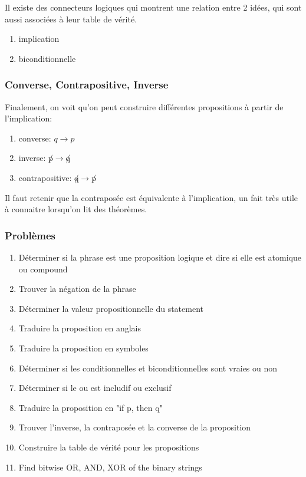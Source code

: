 \documentclass{article}
\begin{document}
Il existe des connecteurs logiques qui montrent une relation entre 2 idées,
qui sont aussi associées à leur table de vérité.
\begin{enumerate}
    \item implication
    \item biconditionnelle
\end{enumerate}

\subsubsection{Converse, Contrapositive, Inverse}

Finalement, on voit qu'on peut construire différentes propositions à partir
de l'implication:
\begin{enumerate}
    \item converse: $ q \rightarrow p $
    \item inverse: $ \not p \rightarrow \not q$
    \item contrapositive: $\not q \rightarrow \not p $
\end{enumerate}

Il faut retenir que la contraposée est équivalente à l'implication, un
fait très utile à connaitre lorsqu'on lit des théorèmes.

\subsubsection{Problèmes}
\begin{enumerate}
    \item Déterminer si la phrase est une proposition logique et dire si
	elle est atomique ou compound
    \item Trouver la négation de la phrase
    \item Déterminer la valeur propositionnelle du statement
    \item Traduire la proposition en anglais
    \item Traduire la proposition en symboles
    \item Déterminer si les conditionnelles et biconditionnelles sont
	vraies ou non
    \item Déterminer si le ou est includif ou exclusif
    \item Traduire la proposition en "if p, then q"
    \item Trouver l'inverse, la contraposée et la converse de la proposition
    \item Construire la table de vérité pour les propositions
    \item Find bitwise OR, AND, XOR of the binary strings
\end{enumerate}
\end{document}
